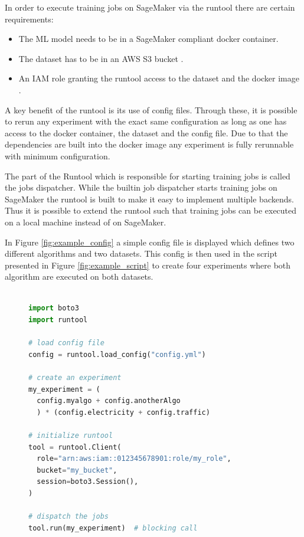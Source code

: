 In order to execute training jobs on SageMaker via the runtool there are certain requirements:
\begin{itemize}
  \item The ML model needs to be in a SageMaker compliant docker container.
  \item The dataset has to be in an AWS S3 bucket \cite{s3_website}.
  \item An IAM role granting the runtool access to the dataset and the docker image \cite{}.
\end{itemize}

A key benefit of the runtool is its use of config files. Through these, it is possible to rerun any experiment with the exact same configuration as long as one has access to the docker container, the dataset and the config file. Due to that the dependencies are built into the docker image any experiment is fully rerunnable with minimum configuration.

The part of the Runtool which is responsible for starting training jobs is called the jobs dispatcher. While the builtin job dispatcher starts training jobs on SageMaker the runtool is built to make it easy to implement multiple backends. Thus it is possible to extend the runtool such that training jobs can be executed on a local machine instead of on SageMaker.

In Figure \ref{fig:example_config} a simple config file is displayed which defines two different algorithms and two datasets. This config is then used in the script presented in Figure \ref{fig:example_script}  to create four experiments where both algorithm are executed on both datasets.

\begin{figure}[h]
  \begin{lstlisting}[language=Python, label={fig:example_script}, caption={Python script using the config from Figure \ref{fig:example_config} to create four experiments}]

import boto3
import runtool

# load config file
config = runtool.load_config("config.yml")

# create an experiment
my_experiment = (
  config.myalgo + config.anotherAlgo
  ) * (config.electricity + config.traffic)

# initialize runtool
tool = runtool.Client(
  role="arn:aws:iam::012345678901:role/my_role",
  bucket="my_bucket",
  session=boto3.Session(),
)

# dispatch the jobs
tool.run(my_experiment)  # blocking call

  \end{lstlisting}

\end{figure}
\clearpage


